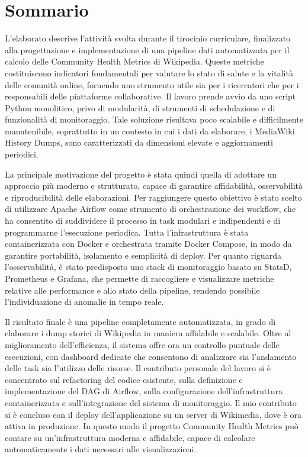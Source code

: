 \chapter*{Sommario} %
\label{sommario}


L’elaborato descrive l’attività svolta durante il tirocinio curriculare,
finalizzato alla progettazione e implementazione di una pipeline dati automatizzata per il calcolo delle Community Health Metrics di Wikipedia.
Queste metriche costituiscono indicatori fondamentali per valutare lo stato di salute e la vitalità delle comunità online, fornendo uno strumento utile sia per i ricercatori che per i responsabili delle piattaforme collaborative.
Il lavoro prende avvio da uno script Python monolitico, privo di modularità, di strumenti di schedulazione e di funzionalità di monitoraggio.
Tale soluzione risultava poco scalabile e difficilmente manutenibile, soprattutto in un contesto in cui i dati da elaborare, i MediaWiki History Dumps, sono caratterizzati da dimensioni elevate e aggiornamenti periodici.


La principale motivazione del progetto è stata quindi quella di adottare un approccio più moderno e strutturato, capace di garantire affidabilità, osservabilità e riproducibilità delle elaborazioni.
Per raggiungere questo obiettivo è stato scelto di utilizzare Apache Airflow come strumento di orchestrazione dei workflow,
che ha consentito di suddividere il processo in task modulari e indipendenti e di programmarne l’esecuzione periodica.
Tutta l’infrastruttura è stata containerizzata con Docker e orchestrata tramite Docker Compose, in modo da garantire portabilità, isolamento e semplicità di deploy.
Per quanto riguarda l’osservabilità, è stato predisposto uno stack di monitoraggio basato su StatsD, Prometheus e Grafana, che permette di raccogliere e visualizzare metriche relative alle performance e allo stato della pipeline, rendendo possibile l’individuazione di anomalie in tempo reale.


Il risultato finale è una pipeline completamente automatizzata, in grado di elaborare i dump storici di Wikipedia in maniera affidabile e scalabile. Oltre al miglioramento dell’efficienza,
il sistema offre ora un controllo puntuale delle esecuzioni, con dashboard dedicate che consentono di analizzare sia l'andamento delle task sia l'utilizzo delle risorse.
Il contributo personale del lavoro si è concentrato sul refactoring del codice esistente, sulla definizione e implementazione del DAG di Airflow, sulla configurazione dell'infrastruttura containerizzata e sull'integrazione del sistema di monitoraggio.
Il mio contributo si è concluso con il deploy dell’applicazione su un server di Wikimedia,
dove è ora attiva in produzione. In questo modo il progetto Community Health Metrics può contare su un’infrastruttura moderna e affidabile,
capace di calcolare automaticamente i dati necessari alle visualizzazioni.


\newpage